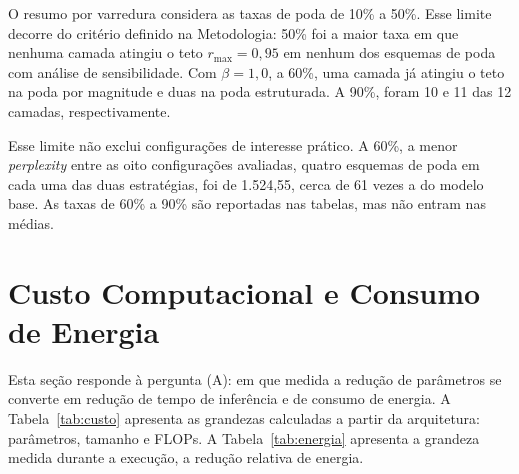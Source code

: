 O resumo por varredura considera as taxas de poda de
10\% a 50\%. Esse limite decorre do critério definido na Metodologia: 50\% foi a maior taxa em
que nenhuma camada atingiu o teto $r_{\max} = 0{,}95$ em nenhum dos esquemas de poda com
análise de sensibilidade. Com $\beta = 1{,}0$, a 60\%, uma camada já atingiu o teto na poda por
magnitude e duas na poda estruturada. A 90\%, foram 10 e 11 das 12 camadas, respectivamente.

Esse limite não exclui configurações de interesse prático. A 60\%, a menor \textit{perplexity}
entre as oito configurações avaliadas, quatro esquemas de poda em cada uma das duas
estratégias, foi de 1.524,55, cerca de 61 vezes a do modelo base. As taxas de 60\% a 90\% são
reportadas nas tabelas, mas não entram nas médias.

\section{Custo Computacional e Consumo de Energia}\label{sec:res_custo}

Esta seção responde à pergunta (A): em que medida
a redução de parâmetros se converte em redução de tempo de inferência e de consumo de energia.
A Tabela~\ref{tab:custo} apresenta as grandezas calculadas a partir da arquitetura: parâmetros,
tamanho e FLOPs. A Tabela~\ref{tab:energia} apresenta a grandeza medida durante a execução, a
redução relativa de energia.

